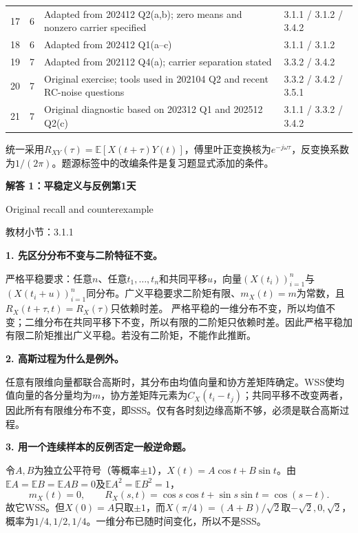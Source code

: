 \documentclass[10.5pt,fontset=fandol]{ctexart}
\newcommand{\E}{\mathbb E}\newcommand{\ee}{\mathrm e}\newcommand{\jj}{\mathrm j}
\newcommand{\qtitle}[2]{\par\addvspace{.85em}\Needspace{10\baselineskip}\begin{tcolorbox}[colback=navy,colframe=navy,arc=1.5pt,boxrule=0pt]\color{white}\large\bfseries #1\hfill\small #2\end{tcolorbox}}
\newcommand{\step}[1]{\par\addvspace{.4em}\Needspace{4\baselineskip}\textbf{#1}\par}\hypersetup{pdftitle={SSA Chapter 3 Review Solutions - Chinese}}
\begin{document}
{\begin{xltabular}{\textwidth}{@{}r r L{9.4cm} X@{}}
17 & 6 & Adapted from 202412 Q2(a,b); zero means and nonzero carrier specified & 3.1.1 / 3.1.2 / 3.4.2\\

18 & 6 & Adapted from 202412 Q1(a--c) & 3.1.1 / 3.1.2\\

19 & 7 & Adapted from 202112 Q4(a); carrier separation stated & 3.3.2 / 3.4.2\\

20 & 7 & Original exercise; tools used in 202104 Q2 and recent RC-noise questions & 3.3.2 / 3.4.2 / 3.5.1\\

21 & 7 & Original diagnostic based on 202312 Q1 and 202512 Q2(c) & 3.1.1 / 3.3.2 / 3.4.2\\

\end{xltabular}}

\par\medskip 统一采用$R_{XY}(\tau)=\E[X(t+\tau)Y(t)]$，傅里叶正变换核为$e^{-j\omega\tau}$，反变换系数为$1/(2\pi)$。题源标签中的改编条件是复习题显式添加的条件。\clearpage

\qtitle{解答 1：平稳定义与反例}{第1天}
{\small\color{accentred}Original recall and counterexample}\par{\small\color{muted}教材小节：3.1.1}\par\smallskip\step{1. 先区分分布不变与二阶特征不变。}
严格平稳要求：任意$n$、任意$t_1,\ldots,t_n$和共同平移$u$，向量$(X(t_i))_{i=1}^n$与$(X(t_i+u))_{i=1}^n$同分布。广义平稳要求二阶矩有限、$m_X(t)=m$为常数，且$R_X(t+\tau,t)=R_X(\tau)$只依赖时差。
严格平稳的一维分布不变，所以均值不变；二维分布在共同平移下不变，所以有限的二阶矩只依赖时差。因此严格平稳加有限二阶矩推出广义平稳。若没有二阶矩，不能作此推断。
\step{2. 高斯过程为什么是例外。}
任意有限维向量都联合高斯时，其分布由均值向量和协方差矩阵确定。WSS使均值向量的各分量均为$m$，协方差矩阵元素为$C_X(t_i-t_j)$；共同平移不改变两者，因此所有有限维分布不变，即SSS。仅有各时刻边缘高斯不够，必须是联合高斯过程。
\step{3. 用一个连续样本的反例否定一般逆命题。}
令$A,B$为独立公平符号（等概率$\pm1$），$X(t)=A\cos t+B\sin t$。由$\E A=\E B=\E AB=0$及$\E A^2=\E B^2=1$，
\[m_X(t)=0,\qquad R_X(s,t)=\cos s\cos t+\sin s\sin t=\cos(s-t).\]
故它WSS。但$X(0)=A$只取$\pm1$，而$X(\pi/4)=(A+B)/\sqrt2$取$-\sqrt2,0,\sqrt2$，概率为$1/4,1/2,1/4$。一维分布已随时间变化，所以不是SSS。
\end{document}
